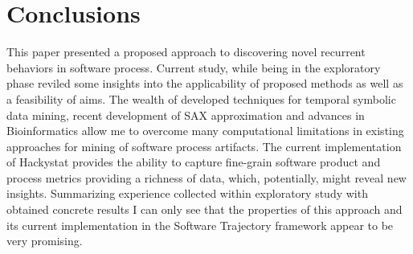 \documentclass{sig-alternate}
\begin{document}
\section{Conclusions}
This paper presented a proposed approach to discovering novel recurrent behaviors in software process. Current study, while being in the exploratory phase reviled some insights into the applicability of proposed methods as well as a feasibility of aims. The wealth of developed techniques for temporal symbolic data mining, recent development of SAX approximation and advances in Bioinformatics allow me to overcome many computational limitations in existing approaches for mining of software process artifacts. The current implementation of Hackystat provides the ability to capture fine-grain software product and process metrics providing a richness of data, which, potentially, might reveal new insights. Summarizing experience collected within exploratory study with obtained concrete results I can only see that the properties of this approach and its current implementation in the Software Trajectory framework appear to be very promising. 


\end{document}
